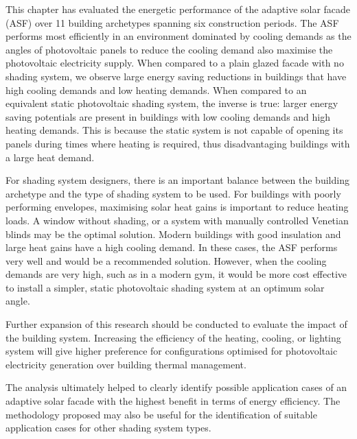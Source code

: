 
This chapter has evaluated the energetic performance of the adaptive solar facade (ASF) over 11 building archetypes spanning six construction periods. The ASF performs most efficiently in an environment dominated by cooling demands as the angles of photovoltaic panels to reduce the cooling demand also maximise the photovoltaic electricity supply. When compared to a plain glazed facade with no shading system, we observe large energy saving reductions in buildings that have high cooling demands and low heating demands. When compared to an equivalent static photovoltaic shading system, the inverse is true: larger energy saving potentials are present in buildings with low cooling demands and high heating demands. This is because the static system is not capable of opening its panels during times where heating is required, thus disadvantaging buildings with a large heat demand. 

For shading system designers, there is an important balance between the building archetype and the type of shading system to be used. For buildings with poorly performing envelopes, maximising solar heat gains is important to reduce heating loads. A window without shading, or a system with manually controlled Venetian blinds may be the optimal solution. Modern buildings with good insulation and large heat gains have a high cooling demand. In these cases, the ASF performs very well and would be a recommended solution. However, when the cooling demands are very high, such as in a modern gym, it would be more cost effective to install a simpler, static photovoltaic shading system at an optimum solar angle. 

Further expansion of this research should be conducted to evaluate the impact of the building system. Increasing the efficiency of the heating, cooling, or lighting system will give higher preference for configurations optimised for photovoltaic electricity generation over building thermal management. 

The analysis ultimately helped to clearly identify possible application cases of an adaptive solar facade with the highest benefit in terms of energy efficiency. The methodology proposed may also be useful for the identification of suitable application cases for other shading system types. 



